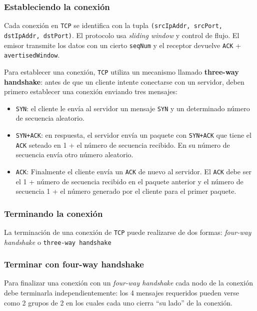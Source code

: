 \documentclass[]{article}
\begin{document}
\subsubsection{Estableciendo la conexión}

Cada conexión en \texttt{TCP} se identifica con la tupla \texttt{(srcIpAddr, srcPort, dstIpAddr, dstPort)}. El protocolo usa \emph{sliding window} y control de flujo. El emisor transmite los datos con un cierto \texttt{seqNum} y el receptor devuelve \texttt{ACK} + \texttt{avertisedWindow}.

Para establecer una conexión, \texttt{TCP} utiliza un mecanismo llamado \textbf{three-way handshake}: antes de que un cliente intente conectarse con un servidor, deben primero establecer una conexión enviando tres mensajes:
\begin{itemize}
    \item \texttt{SYN}: el cliente le envía al servidor un mensaje \texttt{SYN} y un determinado número de secuencia aleatorio.
    \item \texttt{SYN+ACK}: en respuesta, el servidor envía un paquete con \texttt{SYN+ACK} que tiene el \texttt{ACK} seteado en 1 + el número de secuencia recibido. En su número de secuencia envía otro número aleatorio.
    \item \texttt{ACK}: Finalmente el cliente envía un \texttt{ACK} de nuevo al servidor. El \texttt{ACK} debe ser el 1 + número de secuencia recibido en el paquete anterior y el número de secuencia 1 + el número generado por el cliente para el primer paquete.
\end{itemize}


\subsubsection{Terminando la conexión}

La terminación de una conexión de \texttt{TCP} puede realizarse de dos formas: \emph{four-way handshake} o \texttt{three-way handshake}

\subsubsection{Terminar con four-way handshake}
Para finalizar una conexión con un \emph{four-way handshake} cada nodo de la conexión debe terminarla independientemente: los 4 mensajes requeridos pueden verse como 2 grupos de 2 en los cuales cada uno cierra ``su lado'' de la conexión.
\end{document}
